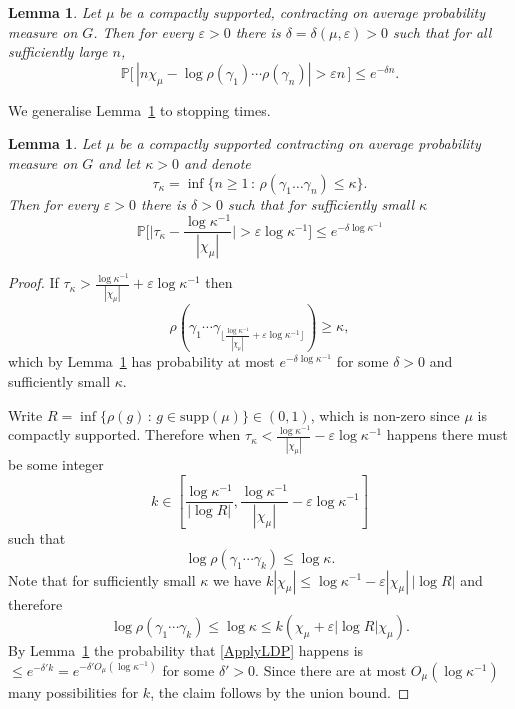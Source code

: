 \documentclass[10pt, english,oneside,reqno]{amsart}
\theoremstyle{plain}
\newtheorem{lemma}[theorem]{Lemma}
\theoremstyle{remark}
\numberwithin{equation}{section}
\numberwithin{figure}{section}
\newcommand{\eps}{\varepsilon}
\begin{document}
\begin{lemma}\label{rhoLDP} Let $\mu$ be a compactly supported, contracting on average probability measure on $G$. Then for every $\eps > 0$ there is $\delta = \delta(\mu,\eps) > 0$ such that for all sufficiently large $n$,
\begin{equation*}
    \mathbb{P}\Big[ \, | n\chi_{\mu} - \log \rho(\gamma_1) \cdots \rho(\gamma_n) | > \eps n \,\Big] \leq e^{-\delta n}.
\end{equation*}
\end{lemma}

We generalise Lemma~\ref{rhoLDP} to stopping times. 

\begin{lemma}\label{rhotauLDP}
    Let $\mu$ be a compactly supported contracting on average probability measure on $G$ and let $\kappa > 0$ and denote $$\tau_{\kappa} = \inf\{ n \geq 1 \,:\, \rho(\gamma_1 \ldots \gamma_n) \leq \kappa \}.$$ Then for every $\eps > 0$ there is $\delta > 0$ such that for sufficiently small $\kappa$ $$\mathbb{P}\Big[ \Big|\tau_{\kappa} -  \frac{\log \kappa^{-1}}{|\chi_{\mu}|} \Big| > \eps \log \kappa^{-1} \Big] \leq e^{-\delta \log \kappa^{-1}}$$
\end{lemma}

\begin{proof}
    If $\tau_{\kappa} > \frac{\log \kappa^{-1}}{|\chi_{\mu}|} + \eps \log \kappa^{-1}$ then $$\rho(\gamma_1 \cdots \gamma_{\lfloor \frac{\log \kappa^{-1}}{|\chi_{\mu}|} + \eps \log \kappa^{-1} \rfloor}) \geq \kappa,$$ which by Lemma~\ref{rhoLDP} has probability at most $e^{-\delta \log \kappa^{-1}}$ for some $\delta > 0$ and sufficiently small $\kappa$.

    Write $R = \inf\{ \rho(g) \,:\, g \in \mathrm{supp}(\mu) \} \in (0,1)$, which is non-zero since $\mu$ is compactly supported. Therefore when $\tau_{\kappa} < \frac{\log \kappa^{-1}}{|\chi_{\mu}|} - \eps \log \kappa^{-1}$ happens there must be some integer $$k \in \left[\frac{\log \kappa^{-1}}{|\log R|},  \frac{\log \kappa^{-1}}{|\chi_{\mu}|} - \eps \log \kappa^{-1} \right]$$ such that $$\log \rho(\gamma_1 \cdots \gamma_k) \leq \log \kappa.$$ Note that for sufficiently small $\kappa$ we have $k |\chi_{\mu}| \leq \log \kappa^{-1} - \eps |\chi_{\mu}| \, |\log R|$ and therefore 
    \begin{equation}\label{ApplyLDP}
        \log \rho(\gamma_1 \cdots \gamma_k) \leq \log \kappa \leq k(\chi_{\mu}  + \eps |\log R| \chi_{\mu}).
    \end{equation}
    By Lemma~\ref{rhoLDP} the probability that \eqref{ApplyLDP} happens is $\leq e^{-\delta' k} = e^{-\delta' O_{\mu}(\log \kappa^{-1})}$ for some $\delta' > 0$. Since there are at most $O_{\mu}(\log \kappa^{-1})$ many possibilities for $k$, the claim follows by the union bound. 
\end{proof}
\end{document}
